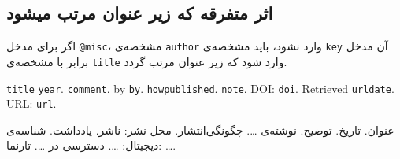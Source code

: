 \documentclass[a4paper,11pt]{article}
\begin{document}
\subsection{اثر متفرقه که زیر عنوان مرتب میشود}
اگر برای مدخل \verb|@misc|، مشخصه‌ی \verb|author| وارد نشود، باید مشخصه‌ی \verb|key| آن مدخل برابر با مشخصه‌ی \verb|title| وارد شود که زیر عنوان مرتب گردد.

\begin{itemize}[nosep]
\begin{latin}
\item[] []
{\tt title} {\tt year}. {\tt comment}. by {\tt by}. {\tt howpublished}. {\tt note}. DOI: {\tt doi}. Retrieved {\tt urldate}. URL: {\tt url}. 
\end{latin}

\item[] []
{\persianttfamily عنوان}. {\persianttfamily تاریخ}. {\persianttfamily توضیح}. نوشته‌ی {\persianttfamily …}. {\persianttfamily چگونگی‌انتشار}. {\persianttfamily محل نشر: ناشر}. {\persianttfamily یادداشت}. شناسه‌ی دیجیتال: {\persianttfamily …}. دسترسی در {\persianttfamily …}. تارنما: {\persianttfamily …}. 
\end{itemize}
\end{document}
